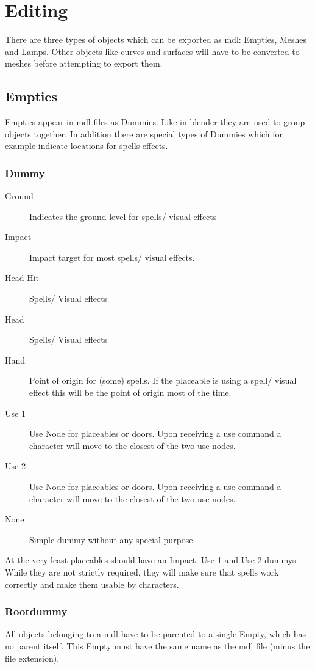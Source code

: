 \section{Editing}
There are three types of objects which can be exported as mdl: Empties,
Meshes and Lamps. Other objects like curves and surfaces will have to be
converted to meshes before attempting to export them.

\subsection{Empties}
Empties appear in mdl files as Dummies. Like in blender they are used to group
objects together. In addition there are special types of Dummies which for
example indicate locations for spells effects.

\subsubsection{Dummy}

\begin{description}
    \item[Ground] Indicates the ground level for spells/ visual effects
    \item[Impact] Impact target for most spells/ visual effects.
    \item[Head Hit] Spells/ Visual effects
    \item[Head] Spells/ Visual effects
    \item[Hand] Point of origin for (some) spells. If the placeable is using a spell/ visual effect this will be the point of origin most of the time.
    \item[Use 1] Use Node for placeables or doors. Upon receiving a use command a character will move to the closest of the two use nodes.
    \item[Use 2] Use Node for placeables or doors. Upon receiving a use command a character will move to the closest of the two use nodes.
    \item[None] Simple dummy without any special purpose.
\end{description}
At the very least placeables should have an Impact, Use 1 and Use 2 dummys.
While they are not strictly required, they will make sure that spells
work correctly and make them usable by characters.

\subsubsection{Rootdummy}
All objects belonging to a mdl have to be parented to a single Empty, which
has no parent itself. This Empty must have the same name as the mdl file
(minus the file extension).

